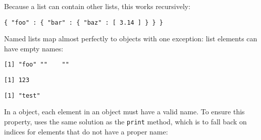  Because a list can contain other lists, this works recursively:

\begin{knitrout}\mycodesize
{}\color{fgcolor}\begin{kframe}
\begin{alltt}
\hlstd{(}\hlstd{(}\hlstd{(}\hlstd{=}\hlstd{(}\hlstd{=}\hlstd{(}
\end{alltt}
\begin{verbatim}
{ "foo" : { "bar" : { "baz" : [ 3.14 ] } } }
\end{verbatim}
\end{kframe}
\end{knitrout}


 Named lists map almost perfectly to \JSON objects with one exception: list elements can have empty names:

\begin{knitrout}\mycodesize
{}\color{fgcolor}\begin{kframe}
\begin{alltt}
 \hlkwb{<-} \hlstd{(} \hlstd{=} \hlstd{,} \hlstd{,} \hlstd{)}
 \hlstd{)}
\end{alltt}
\begin{verbatim}
[1] "foo" ""    ""   
\end{verbatim}
\begin{alltt}
\hlopt{$}
\end{alltt}
\begin{verbatim}
[1] 123
\end{verbatim}
\begin{alltt}
\hlstd{x[[}\hlstd{]]}
\end{alltt}
\begin{verbatim}
[1] "test"
\end{verbatim}
\end{kframe}
\end{knitrout}


 In a \JSON object, each element in an object must have a valid name. To ensure this property, \jsonlite uses the same solution as the \texttt{print} method, which is to fall back on indices for elements that do not have a proper name:

